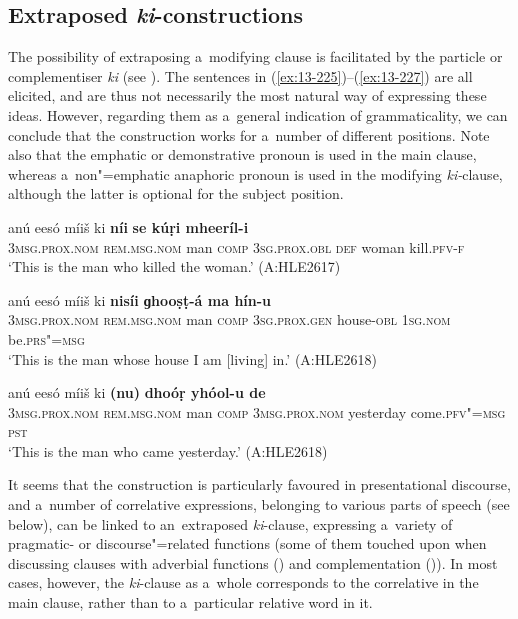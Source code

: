 \subsection{Extraposed \textit{ki}-constructions}
\label{subsec:13-6-7}

The possibility of extraposing a~modifying clause is facilitated by the particle or complementiser \textit{ki} (see ). The sentences in (\ref{ex:13-225})--(\ref{ex:13-227}) are all elicited, and are thus not necessarily the most natural way of expressing these ideas. However, regarding them as a~general indication of grammaticality, we can conclude that the construction works for a~number of different positions. Note also that the emphatic or demonstrative pronoun is used in the main clause, whereas a~non"=emphatic anaphoric pronoun is used in the modifying \textit{ki-}clause, although the latter is optional for the subject position.

\begin{exe}
\ex
\label{ex:13-225}
\gll anú eesó míiš ki \textbf{níi} \textbf{ se kúṛi mheeríl-i}\\
\textsc{3msg.prox.nom} \textsc{rem.msg.nom} man \textsc{comp} \textsc{3sg.prox.obl} \textsc{def} woman kill.\textsc{pfv-f}\\
\glt `This is the man who killed the woman.' (A:HLE2617)

\ex
\label{ex:13-226}
\gll anú eesó míiš ki \textbf{nisíi} \textbf{ ɡhooṣṭ-á ma hín-u}\\
\textsc{3msg.prox.nom} \textsc{rem.msg.nom} man \textsc{comp} \textsc{3sg.prox.gen} house-\textsc{obl} \textsc{1sg.nom} be.\textsc{prs"=msg}\\
\glt `This is the man whose house I am [living] in.' (A:HLE2618)

\ex
\label{ex:13-227}
\gll anú eesó míiš ki \textbf{(nu)} \textbf{ dhoóṛ yhóol-u de}\\
\textsc{3msg.prox.nom} \textsc{rem.msg.nom} man \textsc{comp} \textsc{3msg.prox.nom} yesterday come.\textsc{pfv"=msg} \textsc{pst}\\
\glt `This is the man who came yesterday.' (A:HLE2618) 
\end{exe}

It seems that the construction is particularly favoured in presentational discourse, and a~number of correlative expressions, belonging to various parts of speech (see below), can be linked to an~extraposed \textit{ki}-clause, expressing a~variety of pragmatic- or discourse"=related functions (some of them touched upon when discussing clauses with adverbial functions () and complementation ()). In most cases, however, the \textit{ki}-clause as a~whole corresponds to the correlative in the main clause, rather than to a~particular relative word in it.

